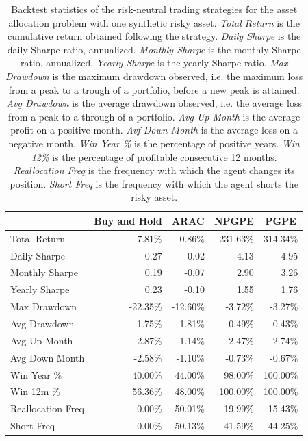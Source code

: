 \begin{table}[t!]
\centering
\begin{tabular}{@{}lrrrr@{}}
\toprule
 & \multicolumn{1}{c}{Buy and Hold} & \multicolumn{1}{c}{ARAC} & \multicolumn{1}{c}{NPGPE} & \multicolumn{1}{c}{PGPE} \\ \midrule
Total Return 		& 7.81\% 	& -0.86\% 	& 231.63\% 	& 314.34\% \\
Daily Sharpe 		& 0.27 		& -0.02 	& 4.13 		& 4.95 \\
Monthly Sharpe 		& 0.19 		& -0.07 	& 2.90 		& 3.26 \\
Yearly Sharpe 		& 0.23 		& -0.10 	& 1.55 		& 1.76 \\
Max Drawdown 		& -22.35\% 	& -12.60\% 	& -3.72\% 	& -3.27\% \\
Avg Drawdown 		& -1.75\% 	& -1.81\% 	& -0.49\% 	& -0.43\% \\
Avg Up Month 		& 2.87\% 	& 1.14\% 	& 2.47\% 	& 2.74\% \\
Avg Down Month 		& -2.58\%	& -1.10\% 	& -0.73\% 	& -0.67\% \\
Win Year \% 		& 40.00\% 	& 44.00\% 	& 98.00\% 	& 100.00\% \\
Win 12m \% 			& 56.36\% 	& 48.00\% 	& 100.00\% 	& 100.00\% \\
Reallocation Freq 	& 0.00\% 	& 50.01\% 	& 19.99\% 	& 15.43\% \\
Short Freq 			& 0.00\% 	& 50.13\% 	& 41.59\% 	& 44.25\% \\ \bottomrule
\end{tabular}
\caption[Backtest statistics for risk-neutral learning with one synthetic risky asset]{Backtest statistics of the risk-neutral trading strategies for the asset allocation problem with one synthetic risky asset. \emph{Total Return} is the cumulative return obtained following the strategy. \emph{Daily Sharpe} is the daily Sharpe ratio, annualized. \emph{Monthly Sharpe} is the monthly Sharpe ratio, annualized. \emph{Yearly Sharpe} is the yearly Sharpe ratio. \emph{Max Drawdown} is the maximum drawdown observed, i.e. the maximum loss from a peak to a trough of a portfolio, before a new peak is attained. \emph{Avg Drawdown} is the average drawdown observed, i.e. the average loss from a peak to a through of a portfolio. \emph{Avg Up Month} is the average profit on a positive month. \emph{Avf Down Month} is the average loss on a negative month. \emph{Win Year \%} is the percentage of positive years. \emph{Win 12\%} is the percentage of profitable consecutive 12 months. \emph{Reallocation Freq} is the frequency with which the agent changes its position. \emph{Short Freq} is the frequency with which the agent shorts the risky asset.}
\label{tab:single_synthetic_neutral_performance}
\end{table}

